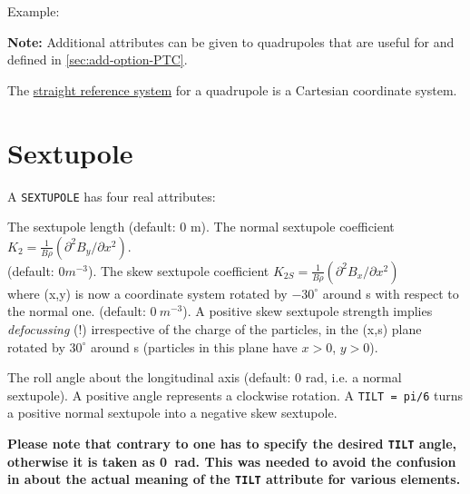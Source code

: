 Example: 

\textbf{Note:} Additional attributes can be given to quadrupoles that
are useful for \ptc and defined in \ref{sec:add-option-PTC}.

The \hyperref[subsec:local-straight]{straight reference system} for
a quadrupole is a Cartesian coordinate system.


\section{Sextupole}
\label{sec:sextupole}


A \texttt{SEXTUPOLE} has four real attributes: 
\begin{madlist}
     The sextupole length (default: 0 m). 
     The normal sextupole coefficient $K_2 = \frac{1}{B \rho}
      (\partial^2 B_y / \partial x^2)$. \\       
      (default: $0 m^{-3}$). 
     The skew sextupole coefficient 
      $K_{2S} = \frac{1}{B \rho} (\partial^2 B_x / \partial x^2)$ \\
      where (x,y) is now a coordinate system rotated by $-30^\circ$ around s with
      respect to the normal one. (default: $0\ m^{-3}$). A positive skew
      sextupole strength implies \textsl{defocussing} (!) 
      irrespective of the charge of the particles,
      in the (x,s) plane rotated by $30^\circ$ around s (particles in
      this plane have $x > 0$, $y > 0$).  

     The roll angle about the longitudinal axis (default: 0
      rad, i.e. a normal sextupole). A positive angle represents a
      clockwise rotation. A \texttt{TILT = pi/6} turns a positive normal 
      sextupole into a negative skew sextupole.
      
      \textbf{Please note that contrary to \madeight one has to specify the
        desired \texttt{TILT} angle, otherwise it is taken as
        0~rad. This was needed to avoid the confusion in \madeight about
        the actual meaning of the \texttt{TILT} attribute for various
        elements.}  
\end{madlist}

